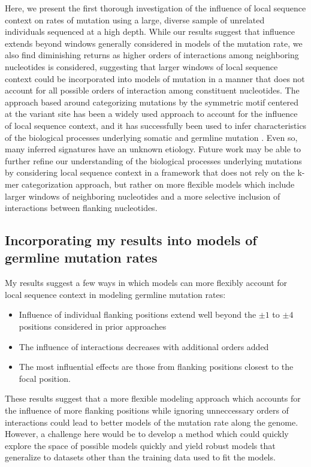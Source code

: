 Here, we present the first thorough investigation of the influence of local sequence context on rates of mutation using a large, diverse sample of unrelated individuals sequenced at a high depth. While our results suggest that influence extends beyond windows generally considered in models of the mutation rate, we also find diminishing returns as higher orders of interactions among neighboring nucleotides is considered, suggesting that larger windows of local sequence context could be incorporated into models of mutation in a manner that does not account for all possible orders of interaction among constituent nucleotides. The approach based around categorizing mutations by the symmetric motif centered at the variant site has been a widely used approach to account for the influence of local sequence context, and it has successfully been used to infer characteristics of the biological processes underlying somatic and germline mutation \citep{Alexandrov2020}. Even so, many inferred signatures have an unknown etiology. Future work may be able to further refine our understanding of the biological processes underlying mutations by considering local sequence context in a framework that does not rely on the k-mer categorization approach, but rather on more flexible models which include larger windows of neighboring nucleotides and a more selective inclusion of interactions between flanking nucleotides.

\subsection{Incorporating my results into models of germline mutation rates}

My results suggest a few ways in which models can more flexibly account for local sequence context in modeling germline mutation rates:

\begin{itemize}
  \item Influence of individual flanking positions extend well beyond the $\pm 1$ to $\pm 4$ positions considered in prior approaches \citep{Aggarwala2016, Carlson2018, Seplyarskiy2023} 
  \item The influence of interactions decreases with additional orders added
  \item The most influential effects are those from flanking positions closest to the focal position.
\end{itemize}

These results suggest that a more flexible modeling approach which accounts for the influence of more flanking positions while ignoring unneccessary orders of interactions could lead to better models of the mutation rate along the genome. However, a challenge here would be to develop a method which could quickly explore the space of possible models quickly and yield robust models that generalize to datasets other than the training data used to fit the models.

